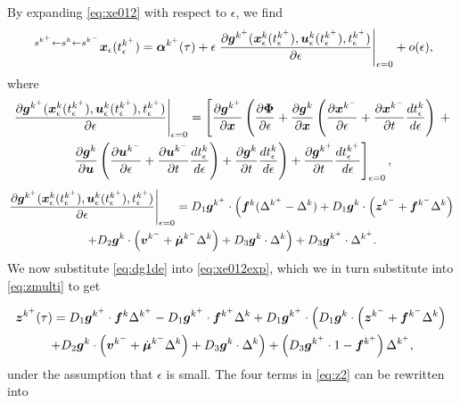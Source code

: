 \documentclass[../DC2017114Bouma.tex]{subfiles}
\begin{document}
By expanding \eqref{eq:xe012} with respect to $\epsilon$, we find
\begin{align}
\ ^{s^{k^+}\leftarrow s^{k}\leftarrow s^{k^-}}{\boldsymbol{x}}_\epsilon(t_\epsilon^{k^+}) = \boldsymbol{\alpha}^{k^+}(\tau) + \epsilon\left.\frac{\partial{\boldsymbol{g}}^{k^+}({\boldsymbol{x}}^{k}_\epsilon(t_\epsilon^{k^+}),{\boldsymbol{u}}^{k}_\epsilon(t_\epsilon^{k^+}),t_\epsilon^{k^+})}{\partial\epsilon}\right|_{\epsilon=0} + o(\epsilon),\label{eq:xe012exp}
\end{align}
where
\begin{multline}
\left.\frac{\partial{\boldsymbol{g}}^{k^+}({\boldsymbol{x}}^{k}_\epsilon(t_\epsilon^{k^+}),{\boldsymbol{u}}^{k}_\epsilon(t_\epsilon^{k^+}),t_\epsilon^{k^+})}{\partial\epsilon}\right|_{\epsilon=0} = \left[\frac{\partial{\boldsymbol{g}}^{k^+}}{\partial{\boldsymbol{x}}}\left(\frac{\partial\boldsymbol{\Phi}}{\partial\epsilon} + \frac{\partial{\boldsymbol{g}}^{k}}{\partial{\boldsymbol{x}}}\left(\frac{\partial{\boldsymbol{x}}^{k^-}}{\partial\epsilon} + \frac{\partial{\boldsymbol{x}}^{k^-}}{\partial t}\frac{d t_\epsilon^{k}}{d \epsilon}\right)\right.\right. +\\ \left.\left.\frac{\partial{\boldsymbol{g}}^{k}}{\partial{\boldsymbol{u}}}\left(\frac{\partial{\boldsymbol{u}}^{k^-}}{\partial\epsilon} + \frac{\partial{\boldsymbol{u}}^{k^-}}{\partial t}\frac{d t_\epsilon^{k}}{d \epsilon}\right) + \frac{\partial{\boldsymbol{g}}^{k}}{\partial t}\frac{d t_\epsilon^{k}}{d\epsilon}\right) + \frac{\partial {\boldsymbol{g}}^{k^+}}{\partial t}\frac{dt^{k^+}_\epsilon}{d\epsilon}\right]_{\epsilon=0},
\end{multline}
\begin{multline}
\left.\frac{\partial{\boldsymbol{g}}^{k^+}({\boldsymbol{x}}^{k}_\epsilon(t_\epsilon^{k^+}),{\boldsymbol{u}}^{k}_\epsilon(t_\epsilon^{k^+}),t_\epsilon^{k^+})}{\partial\epsilon}\right|_{\epsilon=0} = D_1{\boldsymbol{g}}^{k^+}\cdot\left({\boldsymbol{f}}^{k}(\Delta^{k^+}-\Delta^{k}) + D_1{\boldsymbol{g}}^{k}\cdot\left({\boldsymbol{z}}^{k^-}+{\boldsymbol{f}}^{k^-}\Delta^{k}\right)\right. \\ \left.+ D_2{\boldsymbol{g}}^{k}\cdot\left({\boldsymbol{v}}^{k^-}+\dot{\boldsymbol{\mu}}^{k^-}\Delta^{k}\right) + D_3{\boldsymbol{g}}^{k}\cdot\Delta^{k}\right)+D_3{\boldsymbol{g}}^{k^+}\cdot\Delta^{k^+}. \label{eq:dg1de}
\end{multline}
We now substitute \eqref{eq:dg1de} into \eqref{eq:xe012exp}, which we in turn substitute into \eqref{eq:zmulti} to get

\begin{multline}
{\boldsymbol{z}}^{k^+}(\tau) = D_1{\boldsymbol{g}}^{k^+}\cdot{\boldsymbol{f}}^{k}\Delta^{k^+} - D_1{\boldsymbol{g}}^{k^+}\cdot{\boldsymbol{f}}^{k^+}\Delta^{k} + D_1{\boldsymbol{g}}^{k^+}\cdot\left(D_1{\boldsymbol{g}}^{k}\cdot\left({\boldsymbol{z}}^{k^-}+{\boldsymbol{f}}^{k^-}\Delta^{k}\right)\right.\\
\left.+D_2{\boldsymbol{g}}^{k}\cdot\left({\boldsymbol{v}}^{k^-}+\dot{\boldsymbol{\mu}}^{k^-}\Delta^{k}\right)+D_3{\boldsymbol{g}}^{k}\cdot\Delta^{k}\right) + \left(D_3{\boldsymbol{g}}^{k^+}\cdot 1 - {\boldsymbol{f}}^{k^+}\right)\Delta^{k^+},\label{eq:z2}
\end{multline}
under the assumption that $\epsilon$ is small. The four terms in \eqref{eq:z2} can be rewritten into
\end{document}
